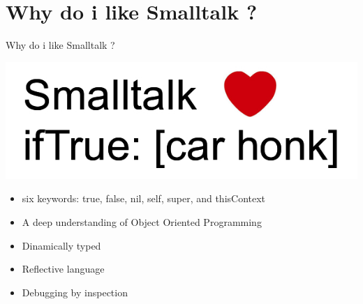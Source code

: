 \documentclass[12pt]{beamer}
\begin{document}
\section{Why do i like Smalltalk ?}
\begin{frame}{Why do i like Smalltalk ?}
	\begin{center}
		\includegraphics[scale=0.2]{images/smalltalkLove.jpg}	
	\end{center}
	\begin{itemize}
		\item six keywords: true, false, nil, self, super, and thisContext
		\item A deep understanding of Object Oriented Programming
		\item Dinamically typed
		\item Reflective language
		\item Debugging by inspection
	\end{itemize}
\end{frame}
\end{document}
